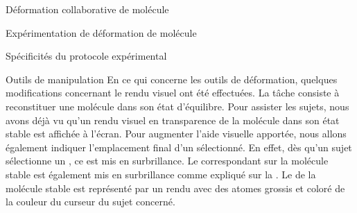 \documentclass[myfrancais]{mythesis}
\begin{document}
\begin{mychapter}{Déformation collaborative de molécule}
\begin{mysection}{Expérimentation de déformation de molécule}
\begin{mysubsection}{Spécificités du protocole expérimental}
\begin{mysubsubsection}{Outils de manipulation}
					En ce qui concerne les outils de déformation, quelques modifications concernant le rendu visuel ont été effectuées.
					La tâche consiste à reconstituer une molécule dans son état d'équilibre.
					Pour assister les sujets, nous avons déjà vu qu'un rendu visuel en transparence de la molécule dans son état stable est affichée à l'écran.
					Pour augmenter l'aide visuelle apportée, nous allons également indiquer l'emplacement final d'un  sélectionné.
					En effet, dès qu'un sujet sélectionne un \myglos{glo-Residu}, ce  est mis en surbrillance.
					Le  correspondant sur la molécule stable est également mis en surbrillance comme expliqué sur la .
					Le  de la molécule stable est représenté par un rendu \myCPK avec des atomes grossis et coloré de la couleur du curseur du sujet concerné.


\end{mysubsubsection}
\end{mysubsection}
\end{mysection}
\end{mychapter}
\end{document}

